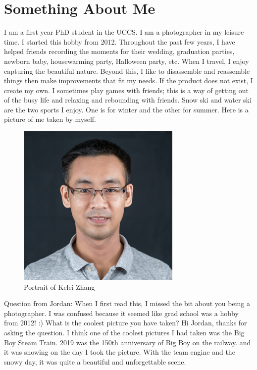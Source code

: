 \section{Something About Me}
I am a first year PhD student in the UCCS. I am a photographer in my leisure time. I started this hobby from 2012. Throughout the past few years, I have helped friends recording the moments for their wedding, graduation parties, newborn baby, housewarming party, Halloween party, etc. When I travel, I enjoy capturing the beautiful nature. Beyond this, I like to disassemble and reassemble things then make improvements that fit my needs. If the product does not exist, I create my own. I sometimes play games with friends; this is a way of getting out of the busy life and relaxing and rebounding with friends. Snow ski and water ski are the two sports I enjoy. One is for winter and the other for summer. Here is a picture of me taken by myself.

\begin{figure}[htbp]
\centerline{\includegraphics{zhang.jpg}}
\caption{Portrait of Kelei Zhang}
\label{fig}
\end{figure}

Question from Jordan: When I first read this, I missed the bit about you being a photographer. I was confused because it seemed like grad school was a hobby from 2012! :) What is the coolest picture you have taken?
Hi Jordan, thanks for asking the question. I think one of the coolest pictures I had taken was the Big Boy Steam Train. 2019 was the 150th anniversary of Big Boy on the railway. and it was snowing on the day I took the picture. With the team engine and the snowy day, it was quite a beautiful and unforgettable scene. 

